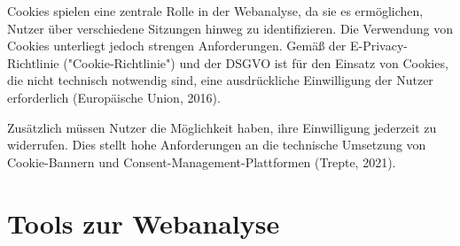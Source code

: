 Cookies spielen eine zentrale Rolle in der Webanalyse, da sie es ermöglichen, Nutzer über verschiedene Sitzungen hinweg zu identifizieren. Die Verwendung von Cookies unterliegt jedoch strengen Anforderungen. Gemäß der E-Privacy-Richtlinie ("Cookie-Richtlinie") und der DSGVO ist für den Einsatz von Cookies, die nicht technisch notwendig sind, eine ausdrückliche Einwilligung der Nutzer erforderlich (Europäische Union, 2016). %

Zusätzlich müssen Nutzer die Möglichkeit haben, ihre Einwilligung jederzeit zu widerrufen. Dies stellt hohe Anforderungen an die technische Umsetzung von Cookie-Bannern und Consent-Management-Plattformen (Trepte, 2021).

\section{Tools zur Webanalyse} %